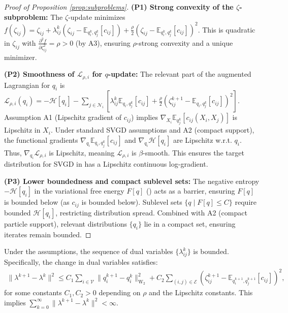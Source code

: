 \begin{proof}[Proof of Proposition \ref{prop:subproblems}]
\textbf{(P1) Strong convexity of the $\zeta$-subproblem:}
The $\zeta$-update  minimizes $f(\zeta_{ij}) = \zeta_{ij} + \lambda_{ij}^k (\zeta_{ij} - \mathbb{E}_{q_i^k, q_j^k}[c_{ij}]) + \frac{\rho}{2} (\zeta_{ij} - \mathbb{E}_{q_i^k, q_j^k}[c_{ij}])^2$. This is quadratic in $\zeta_{ij}$ with $\frac{\partial^2 f}{\partial \zeta_{ij}^2} = \rho > 0$ (by A3), ensuring $\rho$-strong convexity and a unique minimizer.

\textbf{(P2) Smoothness of ${\mathcal{L}}_{\rho, i}$ for $q$-update:}
The relevant part of the augmented Lagrangian for $q_i$ is ${\mathcal{L}}_{\rho, i}(q_i) = -{\mathcal{H}}[q_i] - \sum_{j \in {\mathcal{N}}_i} [ \lambda_{ij}^k \mathbb{E}_{q_i, q_j^k}[c_{ij}] + \frac{\rho}{2} (\zeta_{ij}^{k+1} - \mathbb{E}_{q_i, q_j^k}[c_{ij}])^2 ]$.
Assumption A1 (Lipschitz gradient of $c_{ij}$) implies $\nabla_{X_i} \mathbb{E}_{q_j^k}[c_{ij}(X_i, X_j)]$ is Lipschitz in $X_i$. Under standard SVGD assumptions and A2 (compact support), the functional gradients $\nabla_{q_i} \mathbb{E}_{q_i, q_j^k}[c_{ij}]$ and $\nabla_{q_i} {\mathcal{H}}[q_i]$ are Lipschitz w.r.t. $q_i$. Thus, $\nabla_{q_i} {\mathcal{L}}_{\rho, i}$ is Lipschitz, meaning ${\mathcal{L}}_{\rho, i}$ is $\beta$-smooth. This ensures the target distribution for SVGD in  has a Lipschitz continuous log-gradient.

\textbf{(P3) Lower boundedness and compact sublevel sets:}
The negative entropy $-{\mathcal{H}}[q_i]$ in the variational free energy $F[q]$ () acts as a barrier, ensuring $F[q]$ is bounded below (as $c_{ij}$ is bounded below). Sublevel sets $\{q \mid F[q] \le C\}$ require bounded ${\mathcal{H}}[q_i]$, restricting distribution spread. Combined with A2 (compact particle support), relevant distributions $\{q_i\}$ lie in a compact set, ensuring iterates remain bounded.
\end{proof}

\begin{lemma}
\label{lem:bounded_lambda}
Under the assumptions, the sequence of dual variables $\{\lambda_{ij}^k\}$ is bounded. Specifically, the change in dual variables satisfies:
\begin{equation}
\begin{aligned}
\|\lambda^{k+1} - \lambda^k\|^2 \le C_1 \sum_{i \in {\mathcal{V}}} \|q_i^{k+1} - q_i^k\|^2_{\text{W}_2} + C_2 \sum_{(i,j) \in {\mathcal{E}}} (\zeta_{ij}^{k+1} - \mathbb{E}_{q_i^{k+1}, q_j^{k+1}}[c_{ij}])^2,
\label{eq:lambda_diff_bound}
\end{aligned}
\end{equation}
for some constants $C_1, C_2 > 0$ depending on $\rho$ and the Lipschitz constants. This implies $\sum_{k=0}^\infty \|\lambda^{k+1} - \lambda^k\|^2 < \infty$.
\end{lemma}

